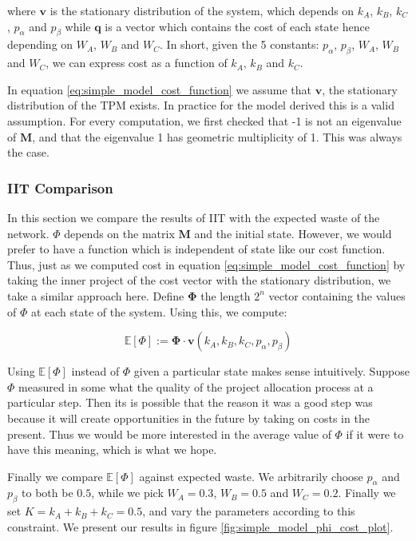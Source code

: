 where $\mathbf{v}$ is the stationary distribution of the system, which depends on $k_A$, $k_B$, $k_C$, $p_\alpha$ and $p_\beta$ while $\mathbf{q}$ is a vector which contains the cost of each state hence depending on $W_A$, $W_B$ and $W_C$. In short, given the 5 constants: $p_\alpha$, $p_\beta$, $W_A$, $W_B$ and $W_C$, we can express cost as a function of $k_A$, $k_B$ and $k_C$. 

\begin{remark}
	In equation \ref{eq:simple_model_cost_function} we assume that $\mathbf{v}$, the stationary distribution of the TPM exists. In practice for the model derived this is a valid assumption. For every computation, we first checked that -1 is not an eigenvalue of $\mathbf{M}$, and that the eigenvalue 1 has geometric multiplicity of 1. This was always the case.
\end{remark}

\subsubsection{IIT Comparison}

In this section we compare the results of IIT with the expected waste of the network. $\Phi$ depends on the matrix $\mathbf{M}$ and the initial state. However, we would prefer to have a function which is independent of state like our cost function. Thus, just as we computed cost in equation \ref{eq:simple_model_cost_function} by taking the inner project of the cost vector with the stationary distribution, we take a similar approach here.
Define $\mathbf{\Phi}$ the length $2^n$ vector containing the values of $\Phi$ at each state of the system. Using this, we compute:

\begin{equation}
\mathbb{E}[\Phi]:= \mathbf{\Phi}\cdot \mathbf{v}(k_A, k_B, k_C, p_\alpha, p_\beta)
\end{equation}

Using $\mathbb{E}[\Phi]$ instead of $\Phi$ given a particular state makes sense intuitively. Suppose $\Phi$ measured in some what the quality of the project allocation process at a particular step. Then its is possible that the reason it was a good step was because it will create opportunities in the future by taking on costs in the present. Thus we would be more interested in the average value of $\Phi$ if it were to have this meaning, which is what we hope.

Finally we compare $\mathbb{E}[\Phi]$ against expected waste. We arbitrarily choose $p_\alpha$ and $p_\beta$ to both be $0.5$, while we pick $W_A=0.3$, $W_B = 0.5$ and $W_C = 0.2$. Finally we set $K = k_A+k_B+k_C = 0.5$, and vary the parameters according to this constraint. We present our results in figure \ref{fig:simple_model_phi_cost_plot}.

